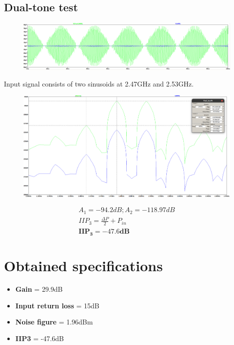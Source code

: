 \documentclass{article}
\begin{document}
\subsection*{Dual-tone test}
\begin{figure}[H]
	\includegraphics[scale=0.27]{../figs/2tone.png}
\end{figure}
Input signal consists of two sinusoids at 2.47GHz and 2.53GHz.
\begin{figure}[H]
	\includegraphics[scale=0.27]{../figs/2tone_ft.png}
\end{figure}

\begin{gather*}
	A_1 = -94.2dB; A_2 = -118.97dB\\
	IIP_3 = \frac{\Delta P}{2} + P_{in}\\
	\mathbf{IIP_3 = -47.6dB}
\end{gather*}
\section*{\hfil Obtained specifications}
\begin{itemize}
	\item \textbf{Gain} = 29.9dB
	\item \textbf{Input return loss} = 15dB
	\item  \textbf{Noise figure} = 1.96dBm
	\item \textbf{IIP3} = -47.6dB
\end{itemize}
\end{document}
